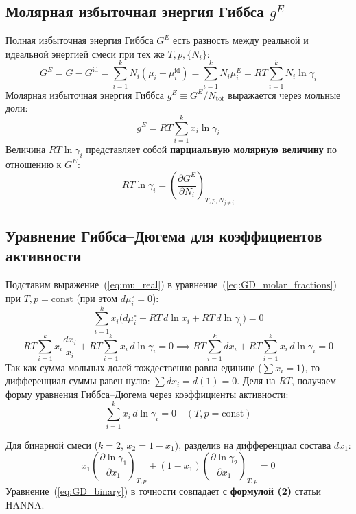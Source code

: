 \documentclass[12pt,a4paper]{article}
\begin{document}
\subsection{Молярная избыточная энергия Гиббса \texorpdfstring{$g^E$}{gE}}
Полная избыточная энергия Гиббса $G^E$ есть разность между реальной и идеальной энергией смеси при тех же $T, p, \{N_i\}$:
\begin{equation}
    G^E = G - G^{\text{id}} = \sum_{i=1}^k N_i (\mu_i - \mu_i^{\text{id}}) = \sum_{i=1}^k N_i \mu_i^E = RT \sum_{i=1}^k N_i \ln \gamma_i
\end{equation}
Молярная избыточная энергия Гиббса $g^E \equiv G^E / N_{\text{tot}}$ выражается через мольные доли:
\begin{equation}
    g^E = RT \sum_{i=1}^k x_i \ln \gamma_i
    \label{eq:gE_def}
\end{equation}
Величина $RT \ln \gamma_i$ представляет собой \textbf{парциальную молярную величину} по отношению к $G^E$:
\begin{equation}
    RT \ln \gamma_i = \left(\frac{\partial G^E}{\partial N_i}\right)_{T, p, N_{j \neq i}}
    \label{eq:partial_molar_gamma}
\end{equation}

\subsection{Уравнение Гиббса--Дюгема для коэффициентов активности}
Подставим выражение~(\ref{eq:mu_real}) в уравнение~(\ref{eq:GD_molar_fractions}) при $T, p = \text{const}$ (при этом $d\mu_i^\circ = 0$):
\begin{equation}
    \sum_{i=1}^k x_i \Big( d\mu_i^\circ + RT\,d\ln x_i + RT\,d\ln \gamma_i \Big) = 0
\end{equation}
\begin{equation}
    RT \sum_{i=1}^k x_i \frac{dx_i}{x_i} + RT \sum_{i=1}^k x_i\,d\ln \gamma_i = 0 \implies RT \sum_{i=1}^k dx_i + RT \sum_{i=1}^k x_i\,d\ln \gamma_i = 0
\end{equation}
Так как сумма мольных долей тождественно равна единице ($\sum x_i = 1$), то дифференциал суммы равен нулю: $\sum dx_i = d(1) = 0$. Деля на $RT$, получаем форму уравнения Гиббса--Дюгема через коэффициенты активности:
\begin{equation}
    \sum_{i=1}^k x_i\,d\ln \gamma_i = 0 \quad (T, p = \text{const})
    \label{eq:GD_gamma}
\end{equation}

Для бинарной смеси ($k=2$, $x_2 = 1 - x_1$), разделив на дифференциал состава $dx_1$:
\begin{equation}
    x_1 \left(\frac{\partial \ln \gamma_1}{\partial x_1}\right)_{T,p} + (1 - x_1)\left(\frac{\partial \ln \gamma_2}{\partial x_1}\right)_{T,p} = 0
    \label{eq:GD_binary}
\end{equation}
Уравнение~(\ref{eq:GD_binary}) в точности совпадает с \textbf{формулой (2)} статьи HANNA.
\end{document}
